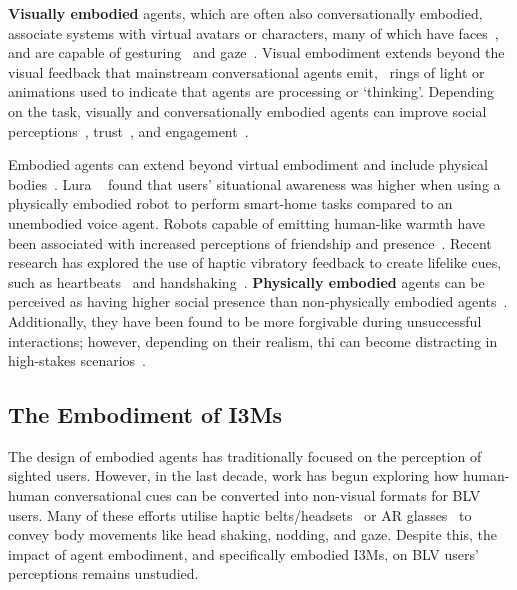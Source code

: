 \textbf{Visually embodied} agents, which are often also conversationally embodied, associate systems with virtual avatars or characters, many of which have faces~\cite{Cassell2001,Kontogiorgos2020,Bickmore2013}, and are capable of gesturing~\cite{Cassell2001,Bickmore2001} and gaze~\cite{Kontogiorgos2020,Shamekhi2018,Bickmore2001}. Visual embodiment  extends beyond the visual feedback that mainstream conversational agents emit, \eg\ rings of light or animations used to indicate that agents are processing or `thinking'. Depending on the task, visually and conversationally embodied agents can improve social perceptions~\cite{Shamekhi2018,Luria2019,Cassell2001,Nowak2003}, trust~\cite{Bickmore2001,Bickmore2013,Rheu2021,Shamekhi2018}, and engagement~\cite{Shamekhi2018,Cassell2001}. 

Embodied agents can extend beyond virtual embodiment and include physical bodies~\cite{Kontogiorgos2020,Luria2017}. Lura \etal~\cite{Luria2017} found that users' situational awareness was higher when using a physically embodied robot to perform smart-home tasks compared to an unembodied voice agent. Robots capable of emitting human-like warmth have been associated with increased perceptions of friendship and presence~\cite{Nie2012}. Recent research has explored the use of haptic vibratory feedback to create lifelike cues, such as heartbeats~\cite {Borgstedt2023} and handshaking~\cite{Bevan2015}. \textbf{Physically embodied} agents can be perceived as having higher social presence than non-physically embodied agents~\cite{Kidd2004}. Additionally, they have been found to be more forgivable during unsuccessful interactions; however, depending on their realism, thi can become distracting in high-stakes scenarios~\cite{Kontogiorgos2020}.

\subsection{The Embodiment of I3Ms}
The design of embodied agents has traditionally focused on the perception of sighted users. However, in the last decade, work has begun exploring how human-human conversational cues can be converted into non-visual formats for BLV users. Many of these efforts utilise haptic belts/headsets~\cite{rader2014,McDaniel2018} or AR glasses~\cite{Qiu2016,Qiu2020} to convey body movements like head shaking, nodding, and gaze. Despite this, the impact of agent embodiment, and specifically embodied I3Ms, on BLV users' perceptions remains unstudied.

